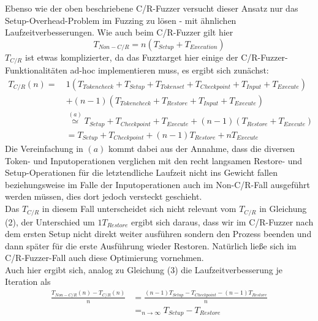 \documentclass[a4paper]{article}
\begin{document}
Ebenso wie der oben beschriebene C/R-Fuzzer versucht dieser Ansatz nur das Setup-Overhead-Problem im Fuzzing zu lösen - mit ähnlichen Laufzeitverbesserungen. Wie auch beim C/R-Fuzzer gilt hier
\begin{equation}
    T_{Non-C/R} = n (T_{Setup} + T_{Execution})
\end{equation}
$T_{C/R}$ ist etwas komplizierter, da das Fuzztarget hier einige der C/R-Fuzzer-Funktionalitäten ad-hoc implementieren muss, es ergibt sich zunächst:
\begin{equation}
    \begin{split}
        T_{C/R}(n) =\ &1 (T_{Tokencheck} + T_{Setup} + T_{Tokenset} + T_{Checkpoint} + T_{Input} + T_{Execute}) \\
            &+ (n - 1) (T_{Tokencheck} + T_{Restore} + T_{Input} + T_{Execute}) \\
            &\overset{(a)}{\simeq} T_{Setup} + T_{Checkpoint} + T_{Execute} + (n-1) (T_{Restore} + T_{Execute}) \\
            &= T_{Setup} + T_{Checkpoint} + (n-1) T_{Restore} + n T_{Execute}
    \end{split}
\end{equation}
Die Vereinfachung in $(a)$ kommt dabei aus der Annahme, dass die diversen Token- und Inputoperationen verglichen mit den recht langsamen Restore- und Setup-Operationen für die letztendliche Laufzeit nicht ins Gewicht fallen beziehungsweise im Falle der Inputoperationen auch im Non-C/R-Fall ausgeführt werden müssen, dies dort jedoch versteckt geschieht.\\
Das $T_{C/R}$ in diesem Fall unterscheidet sich nicht relevant vom $T_{C/R}$ in Gleichung (2), der Unterschied um $1 T_{Restore}$ ergibt sich daraus, dass wir im C/R-Fuzzer nach dem ersten Setup nicht direkt weiter ausführen sondern den Prozess beenden und dann später für die erste Ausführung wieder Restoren. Natürlich ließe sich im C/R-Fuzzer-Fall auch diese Optimierung vornehmen.\\
Auch hier ergibt sich, analog zu Gleichung (3) die Laufzeitverbesserung je Iteration als
\begin{equation}
    \begin{split}
        \frac{T_{Non-C/R}(n) - T_{C/R}(n)}{n} &= \frac{(n-1) T_{Setup} - T_{Checkpoint} - (n-1) T_{Restore}}{n} \\
        &=_{n \to \infty} T_{Setup} - T_{Restore}
    \end{split}
\end{equation}
\end{document}

